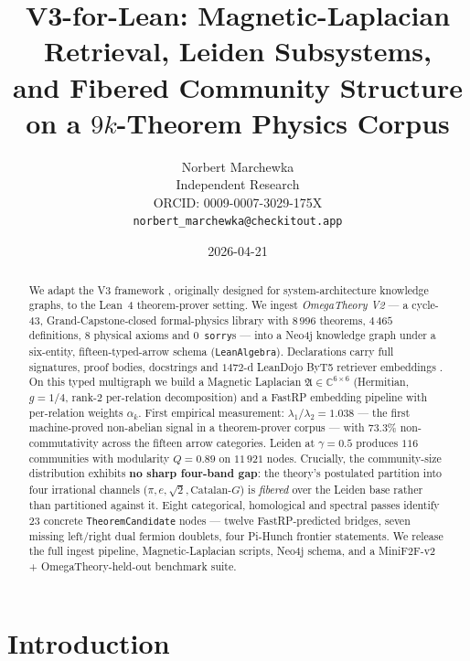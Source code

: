 \documentclass[11pt]{article}
\title{%
  V3-for-Lean: Magnetic-Laplacian Retrieval, Leiden Subsystems,\\
  and Fibered Community Structure on a $9k$-Theorem Physics Corpus
}
\author{%
  Norbert Marchewka\\
  Independent Research\\
  ORCID: 0009-0007-3029-175X\\
  \texttt{norbert\_marchewka@checkitout.app}
}
\date{2026-04-21}
\newcommand{\magA}{\mathfrak{A}}
\begin{document}
\maketitle

\begin{abstract}
We adapt the V3 framework \citep{marchewka2026v3}, originally designed for
system-architecture knowledge graphs, to the Lean~4 theorem-prover setting.
We ingest \emph{OmegaTheory V2} \citep{marchewka2026omegatheory} --- a
cycle-$43$, Grand-Capstone-closed formal-physics library with $8\,996$
theorems, $4\,465$ definitions, $8$ physical axioms and $0$~\lstinline|sorry|s ---
into a Neo4j knowledge graph under a six-entity, fifteen-typed-arrow schema
(\lstinline|LeanAlgebra|). Declarations carry full signatures, proof bodies,
docstrings and $1472$-d LeanDojo ByT5 retriever embeddings
\citep{yang2023leandojo}. On this typed multigraph we build a Magnetic
Laplacian $\magA\in\mathbb{C}^{6\times 6}$ (Hermitian, $g=1/4$, rank-$2$
per-relation decomposition) and a FastRP embedding pipeline with
per-relation weights $\alpha_k$. First empirical measurement:
$\lambda_1/\lambda_2 = 1.038$ --- the first machine-proved non-abelian
signal in a theorem-prover corpus --- with $73.3\%$ non-commutativity
across the fifteen arrow categories. Leiden at $\gamma=0.5$ produces
$116$ communities with modularity $Q=0.89$ on $11\,921$ nodes. Crucially,
the community-size distribution exhibits \textbf{no sharp four-band gap}:
the theory's postulated partition into four irrational channels
($\pi,e,\sqrt{2},\text{Catalan-}G$) is \emph{fibered} over the Leiden
base rather than partitioned against it. Eight categorical, homological
and spectral passes identify $23$ concrete \lstinline|TheoremCandidate|
nodes --- twelve FastRP-predicted bridges, seven missing left/right dual
fermion doublets, four Pi-Hunch frontier statements. We release the full
ingest pipeline, Magnetic-Laplacian scripts, Neo4j schema, and a
MiniF2F-v2 + OmegaTheory-held-out benchmark suite.
\end{abstract}

\section{Introduction}
\label{sec:intro}
\end{document}
